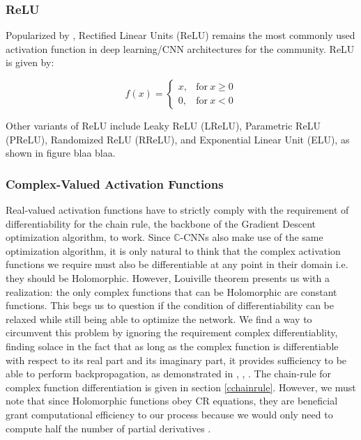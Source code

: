    \subsubsection{ReLU}
   
Popularized by \cite{krizhevsky2012imagenet}, Rectified Linear Units (ReLU) \cite{nair2010rectified} remains the most commonly used activation function in deep learning/CNN architectures for the community. ReLU is given by:

\begin{equation}
f(x) =  
\begin{cases} 
x , &\textrm{for} \ x\ge 0\\
0 , &\textrm{for} \ x < 0
\end{cases}
\end{equation}
 
 
 Other variants of ReLU include Leaky ReLU (LReLU), Parametric ReLU (PReLU), Randomized ReLU (RReLU), and Exponential Linear Unit (ELU), as shown in figure blaa blaa. 
  
 \subsubsection{Complex-Valued Activation Functions}
 
 Real-valued activation functions have to strictly comply with the requirement of differentiability for the chain rule, the backbone of the Gradient Descent optimization algorithm, to work. Since $\mathbb{C}$-CNNs also make use of the 
 same optimization algorithm, it is only natural to think that the complex activation functions we require must also be differentiable at any point in their domain i.e. they should be Holomorphic. However, Louiville theorem presents us with a realization: the only complex functions that can be  Holomorphic are constant functions. This begs us to question if the condition of differentiability can be relaxed while still being able to optimize the network.
 We find a way to circumvent this problem by ignoring the requirement complex differentiablity, finding solace in the fact that as long as the complex function is differentiable with respect to its real part and its imaginary part, it provides sufficiency to be able to perform backpropagation, as demonstrated in \cite{trabelsi2018deep}, \cite{hansch2010complex}, \cite{polsarzhang2017complex}. The chain-rule for complex function differentiation is given in section \ref{cchainrule}. However, we must note that since Holomorphic functions obey CR equations, they are beneficial grant computational efficiency to our process because we would only need to compute half the number of partial derivatives \cite{sarroff2015learning}.
 

